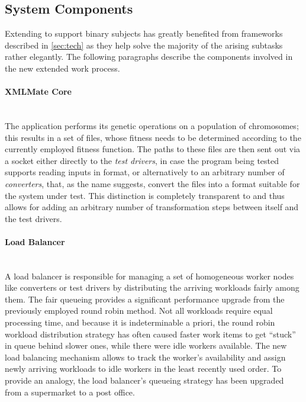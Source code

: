 \subsection{System Components}
\label{sec:components}
Extending \xmlmate to support binary subjects has greatly benefited from frameworks described in
\cref{sec:tech} as they help solve the majority of the arising subtasks rather elegantly. The following
paragraphs describe the components involved in the new extended \xmlmate work process.
\paragraph{XMLMate Core} ~\\
  The \java application \xmlmate performs its genetic operations on a population of chromosomes; this 
  results in a set of \xml files, whose fitness needs to be determined according to the currently employed
  fitness function. The paths to these files are then sent out via a \zmq socket either directly to the
  \emph{test drivers}, in case the program being tested supports reading inputs in \xml format, or alternatively 
  to an arbitrary number of \emph{converters}, that, as the name suggests, convert the \xml files into a format 
  suitable for the system under test. This distinction is completely transparent to \xmlmate and thus allows for 
  adding an arbitrary number of transformation steps between itself and the test drivers.
  \paragraph{Load Balancer} ~\\
  A load balancer is responsible for managing a set of homogeneous worker nodes like converters or test
  drivers by distributing the arriving workloads fairly among them. The fair queueing provides a significant
  performance upgrade from the previously employed round robin method. Not all workloads require equal
  processing time, and because it is indeterminable a priori, the round robin workload distribution strategy
  has often caused faster work items to get ``stuck'' in queue behind slower ones, while there were idle
  workers available. The new load balancing mechanism allows to track the worker's availability and assign
  newly arriving workloads to idle workers in the least recently used order. To provide an analogy, the load
  balancer's queueing strategy has been upgraded from a supermarket to a post office. 
  

